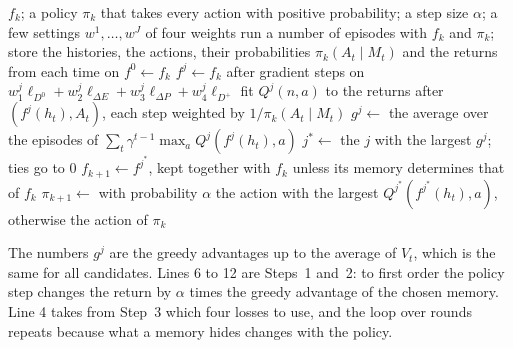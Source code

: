 \documentclass[11pt]{article}
\theoremstyle{definition}
\newcommand{\dE}{\Delta E}
\newcommand{\dP}{\Delta P}
\begin{document}
\begin{algorithm}[h]
\caption{One round of the agent}\label{alg:round}
\begin{algorithmic}[1]
\Require $f_k$; a policy $\pi_k$ that takes every action with positive probability; a step size $\alpha$; a few settings $w^1,\dots,w^J$ of four weights
\State run a number of episodes with $f_k$ and $\pi_k$; store the histories, the actions, their probabilities $\pi_k(A_t\mid M_t)$ and the returns from each time on
\State $f^0\gets f_k$
 
  \State $f^j\gets f_k$ after gradient steps on $w^j_1\ell_{D^0}+w^j_2\ell_{\dE}+w^j_3\ell_{\dP}+w^j_4\ell_{D^+}$
\EndFor
{} 
  \State fit $Q^j(n,a)$ to the returns after $(f^j(h_t),A_t)$, each step weighted by $1/\pi_k(A_t\mid M_t)$
  \State $g^j\gets$ the average over the episodes of $\sum_t\gamma^{t-1}\max_aQ^j(f^j(h_t),a)$
\EndFor
\State $j^*\gets$ the $j$ with the largest $g^j$; ties go to $0$ 
\State $f_{k+1}\gets f^{j^*}$, kept together with $f_k$ unless its memory determines that of $f_k$
\State $\pi_{k+1}\gets$ with probability $\alpha$ the action with the largest $Q^{j^*}(f^{j^*}(h_t),a)$, otherwise the action of $\pi_k$
\end{algorithmic}
\end{algorithm}

The numbers $g^j$ are the greedy advantages up to the average of $V_t$, which is the same for all candidates. Lines 6 to 12 are Steps~1 and~2: to first order the policy step changes the return by $\alpha$ times the greedy advantage of the chosen memory. Line 4 takes from Step~3 which four losses to use, and the loop over rounds repeats because what a memory hides changes with the policy.
\end{document}
